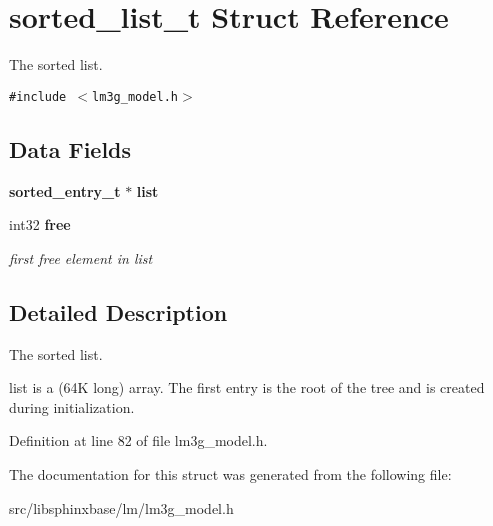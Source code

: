 \section{sorted\_\-list\_\-t Struct Reference}
\label{structsorted__list__t}
The sorted list.  


{\tt \#include $<$lm3g\_\-model.h$>$}

\subsection*{Data Fields}
\begin{CompactItemize}
\item 
{\bf sorted\_\-entry\_\-t} $\ast$ \textbf{list}\label{structsorted__list__t_9c1b67b418297e14f9f6c1ea69dd3969}

\item 
int32 {\bf free}\label{structsorted__list__t_a7468ec9a2fe7c61d2bc76ba43c575ce}

\begin{CompactList}\small\item\em first free element in list \item\end{CompactList}\end{CompactItemize}


\subsection{Detailed Description}
The sorted list. 

list is a (64K long) array. The first entry is the root of the tree and is created during initialization. 

Definition at line 82 of file lm3g\_\-model.h.

The documentation for this struct was generated from the following file:\begin{CompactItemize}
\item 
src/libsphinxbase/lm/lm3g\_\-model.h\end{CompactItemize}
